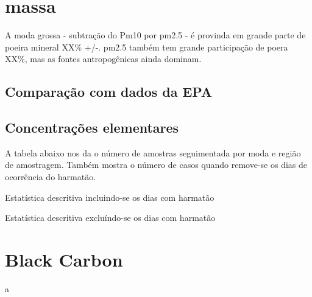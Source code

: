 \section{massa}

A moda grossa - subtração do Pm10 por pm2.5 - é provinda em grande parte
de poeira mineral XX\% +/-. pm2.5 também tem grande participação de poera XX\%, 
mas as fontes antropogênicas ainda dominam.



\subsection{Comparação com dados da EPA}


\subsection{Concentrações elementares}
A tabela abaixo nos da o número de amostras seguimentada por
moda e região de amostragem. 
Também mostra o número de casos quando remove-se os dias de ocorrência do harmatão.

\begin{table}[H]
 \centering
  
  \caption{Estatística descritiva incluindo-se os dias com harmatão}
\end{table}

\begin{table}[H]
  \centering
  
  \caption{Estatística descritiva excluíndo-se os dias com harmatão}
\end{table}

\section{Black Carbon}
a


